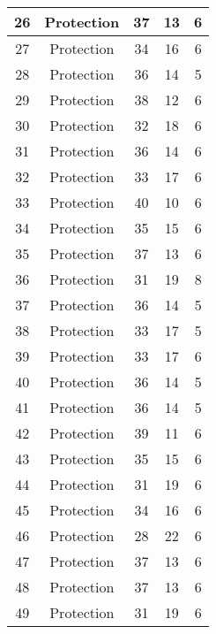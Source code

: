 \documentclass[results.tex]{subfiles}
\begin{document}
\begin{center}
\begin{tabular}{| c || c | c | c | c |}
    \hline
    26 & Protection & 37 & 13 & 6 \\ 
    \hline
    27 & Protection & 34 & 16 & 6 \\ 
    \hline
    28 & Protection & 36 & 14 & 5 \\ 
    \hline
    29 & Protection & 38 & 12 & 6 \\ 
    \hline
    30 & Protection & 32 & 18 & 6 \\ 
    \hline
    31 & Protection & 36 & 14 & 6 \\ 
    \hline
    32 & Protection & 33 & 17 & 6 \\ 
    \hline
    33 & Protection & 40 & 10 & 6 \\ 
    \hline
    34 & Protection & 35 & 15 & 6 \\ 
    \hline
    35 & Protection & 37 & 13 & 6 \\ 
    \hline
    36 & Protection & 31 & 19 & 8 \\ 
    \hline
    37 & Protection & 36 & 14 & 5 \\ 
    \hline
    38 & Protection & 33 & 17 & 5 \\ 
    \hline
    39 & Protection & 33 & 17 & 6 \\ 
    \hline
    40 & Protection & 36 & 14 & 5 \\ 
    \hline
    41 & Protection & 36 & 14 & 5 \\ 
    \hline
    42 & Protection & 39 & 11 & 6 \\ 
    \hline
    43 & Protection & 35 & 15 & 6 \\ 
    \hline
    44 & Protection & 31 & 19 & 6 \\ 
    \hline
    45 & Protection & 34 & 16 & 6 \\ 
    \hline
    46 & Protection & 28 & 22 & 6 \\ 
    \hline
    47 & Protection & 37 & 13 & 6 \\ 
    \hline
    48 & Protection & 37 & 13 & 6 \\ 
    \hline
    49 & Protection & 31 & 19 & 6 \\ 
    \hline   \end{tabular}
\end{center}
\end{document}
